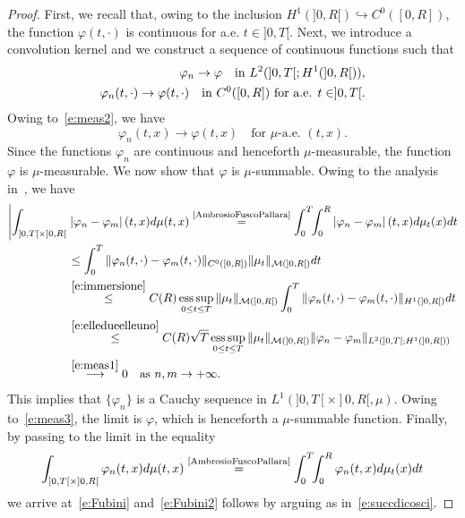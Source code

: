 \documentclass[11pt,leqno]{amsart}
\numberwithin{equation}{section}
\begin{document}
\begin{proof}
First, we recall that, owing to the inclusion
$H^1 (]0, R[)  \hookrightarrow C^0([0, R])$, the function ${\varphi}(t, \cdot)$ is
continuous for a.e. $t \in ]0, T[$.  
Next, we introduce a convolution kernel and we construct a sequence of continuous functions such that
\begin{eqnarray}
    {\varphi}_n \to {\varphi} \quad \text{in $L^2 (]0, T[; H^1 (]0, R[))$}, 
     \label{e:meas1} \\
    {\varphi}_n(t, \cdot) \to {\varphi} (t, \cdot) 
    \quad \text{in $C^0 ([0, R])$ for a.e. $ t \in ]0, T[$}.
    \label{e:meas2}
\end{eqnarray}
Owing to~\eqref{e:meas2}, we have 
\begin{equation}
\label{e:meas3}
{\varphi}_n (t, x) \to {\varphi} (t, x) 
\quad \text{for $\mu$-a.e. $(t, x)$}. 
\end{equation}
Since the functions ${\varphi}_n$ are continuous and henceforth $\mu$-measurable, the function ${\varphi}$ is $\mu$-measurable. We now show that 
${\varphi}$ is $\mu$-summable. Owing to the analysis in~\cite[\S2.5]{AmbrosioFuscoPallara}, we have 
\begin{equation}
  \label{e:succdicosci}
  \begin{split}
    \left| \int_{]0, T[ \times ]0, R[} \right. & \left| {\varphi}_n -
      {\varphi}_m \right| (t, x) d \mu(t, x) 
    \stackrel{\text{\cite[\S2.5]{AmbrosioFuscoPallara}}}{=} 
      \int_0^T \! \! \int_0^R \left| {\varphi}_n - {\varphi}_m \right| (t, x) d
      \mu_t(x) dt 
    \\
    & \leq \int_0^T \| {\varphi}_n(t,\cdot) - {\varphi}_m (t,\cdot)\|_{C^0 ([0,
      R])}
    \| \mu_t \|_{\mathcal M (]0, R[)}dt
    \\
    & \stackrel{\eqref{e:immersione}}{\leq} C(R) \operatorname*{ess\,sup}_{0\le t\le T}
    \| \mu_t \|_{\mathcal M (]0,R[)} \int_0^T \| {\varphi}_n (t,\cdot)-
    {\varphi}_m(t,\cdot) \|_{H^1 (]0, R[)}
    dt
    \\
    & \stackrel{\eqref{e:elledueelleuno}}{\leq} C(R) \sqrt{T} \operatorname*{ess\,sup}_{0\le
      t\le T} \| \mu_t \|_{\mathcal M (]0,R[)}
    \| {\varphi}_n - {\varphi}_m \|_{L^2 (]0, T[; H^1 (]0, R[))} 
    \\
    & \stackrel{\eqref{e:meas1}}{\longrightarrow} 0 \quad \text{as $n,
      m \to + \infty$}.
  \end{split}
\end{equation}
This implies that $\{ {\varphi}_n \}$ is a Cauchy sequence in $L^1(]0, T[ \times ]0, R[, \mu)$. Owing to~\eqref{e:meas3}, the limit is ${\varphi}$, which is henceforth a $\mu$-summable function. Finally,  by passing to the limit in the equality 
$$
    \int_{]0, T[ \times ]0, R[}  {\varphi}_n (t, x) d \mu(t, x)  
      \stackrel{\text{\cite[\S2.5]{AmbrosioFuscoPallara}}}{=} 
       \int_0^T \! \! \int_0^R
       {\varphi}_n  (t, x) d \mu_t(x) dt  
      $$
      we arrive at~\eqref{e:Fubini} and~\eqref{e:Fubini2} follows by arguing as in~\eqref{e:succdicosci}. 
\end{proof}
\end{document}
